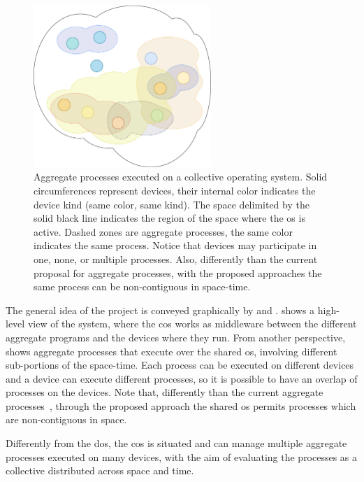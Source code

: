 \documentclass[12pt, a4paper]{article}
\begin{document}
\begin{figure}[h!]
    \centering
    \includegraphics[width=0.6\textwidth]{figures/processes}
    \caption{
        Aggregate processes executed on a collective operating system.
        Solid circumferences represent devices, their internal color indicates the device kind
        (same color, same kind).
        The space delimited by the solid black line indicates the region of the space where the
        \ac{os} is active.
        Dashed zones are aggregate processes,
        the same color indicates the same process.
        Notice that devices may participate in one, none, or multiple processes.
        Also, differently than the current proposal for aggregate processes,
        with the proposed approaches the same process can be non-contiguous in space-time.
    }\label{fig:processes}
\end{figure}

The general idea of the project is conveyed graphically by
 and .
%
 shows a high-level view of the system,
where the \ac{cos} works as middleware between the different aggregate programs and the devices where they run.
%
From another perspective,
 shows aggregate processes that execute over the shared \ac{os},
involving different sub-portions of the space-time.
%
Each process can be executed on different devices and a device can execute different processes,
so it is possible to have an overlap of processes on the devices.
%
Note that, differently than the current aggregate processes~\cite{EAAI2020-processes},
through the proposed approach the shared \ac{os} permits processes which are non-contiguous in space.

Differently from the \ac{dos},
the \ac{cos} is situated and can manage multiple aggregate processes executed on many devices,
with the aim of evaluating the processes as a collective distributed across space and time.
\end{document}
